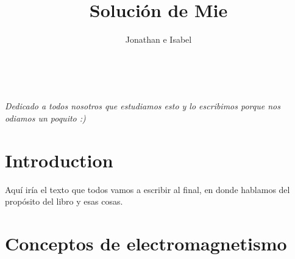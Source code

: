\documentclass[12pts,a4paper]{book}
\title{Solución de Mie}
\author{Jonathan e Isabel}
\begin{document}
	
	
	\frontmatter
	
	\blankpage
	
	\maketitle
	
	
	
	\tableofcontents
	
	\listoffigures
	
	\listoftables
	
	\cleardoublepage
	~\vfill
	\begin{doublespace}
		\noindent\fontsize{18}{22}\selectfont\itshape
		\noindent
		Dedicado a todos nosotros que estudiamos esto y lo escribimos porque nos odiamos un poquito :)
	\end{doublespace}
	\vfill
	\vfill
	
	
	\cleardoublepage
	\chapter*{Introduction}
	
	Aquí iría el texto que todos vamos a escribir al final, en donde hablamos del propósito del libro y esas cosas.
	
	
	\mainmatter
	
	
	\chapter{Conceptos de electromagnetismo}
	\label{ch:repasoEM} %
	
	
	
	
	
\end{document}
